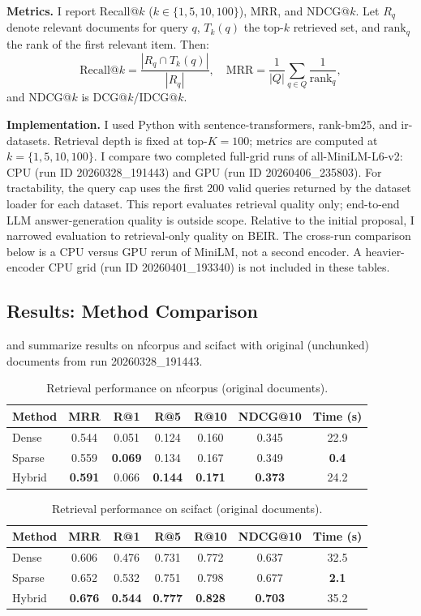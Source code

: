 \documentclass[twoside, 11pt]{article}
\newcommand{\tabref}[1]{\hyperref[#1]{\fcolorbox{red}{white}{Table~\ref*{#1}}}}
\begin{document}
\textbf{Metrics.} I report Recall@$k$ ($k \in \{1, 5, 10, 100\}$), MRR, and NDCG@$k$. Let $R_q$ denote relevant documents for query $q$, $T_k(q)$ the top-$k$ retrieved set, and $\text{rank}_q$ the rank of the first relevant item. Then:
\[
\text{Recall@}k = \frac{|R_q \cap T_k(q)|}{|R_q|}, \quad
\text{MRR} = \frac{1}{|Q|}\sum_{q \in Q}\frac{1}{\text{rank}_q},
\]
and NDCG@$k$ is DCG@$k$/IDCG@$k$.

\textbf{Implementation.} I used Python with sentence-transformers, rank-bm25, and ir-datasets. Retrieval depth is fixed at top-$K=100$; metrics are computed at $k=\{1,5,10,100\}$. I compare two completed full-grid runs of all-MiniLM-L6-v2: CPU (run ID 20260328\_191443) and GPU (run ID 20260406\_235803). For tractability, the query cap uses the first 200 valid queries returned by the dataset loader for each dataset. This report evaluates retrieval quality only; end-to-end LLM answer-generation quality is outside scope.
Relative to the initial proposal, I narrowed evaluation to retrieval-only quality on BEIR. The cross-run comparison below is a CPU versus GPU rerun of MiniLM, not a second encoder. A heavier-encoder CPU grid (run ID 20260401\_193340) is not included in these tables.

\subsection{Results: Method Comparison}
\tabref{tab:nfcorpus} and \tabref{tab:scifact} summarize results on nfcorpus and scifact with original (unchunked) documents from run 20260328\_191443.

\begin{table}[htbp]
\centering
\caption{Retrieval performance on nfcorpus (original documents).}
\label{tab:nfcorpus}
\begin{tabular}{lcccccc}
\toprule
Method & MRR & R@1 & R@5 & R@10 & NDCG@10 & Time (s) \\
\midrule
Dense  & 0.544 & 0.051 & 0.124 & 0.160 & 0.345 & 22.9 \\
Sparse & 0.559 & \textbf{0.069} & 0.134 & 0.167 & 0.349 & \textbf{0.4} \\
Hybrid & \textbf{0.591} & 0.066 & \textbf{0.144} & \textbf{0.171} & \textbf{0.373} & 24.2 \\
\bottomrule
\end{tabular}
\end{table}

\begin{table}[htbp]
\centering
\caption{Retrieval performance on scifact (original documents).}
\label{tab:scifact}
\begin{tabular}{lcccccc}
\toprule
Method & MRR & R@1 & R@5 & R@10 & NDCG@10 & Time (s) \\
\midrule
Dense  & 0.606 & 0.476 & 0.731 & 0.772 & 0.637 & 32.5 \\
Sparse & 0.652 & 0.532 & 0.751 & 0.798 & 0.677 & \textbf{2.1} \\
Hybrid & \textbf{0.676} & \textbf{0.544} & \textbf{0.777} & \textbf{0.828} & \textbf{0.703} & 35.2 \\
\bottomrule
\end{tabular}
\end{table}
\end{document}
